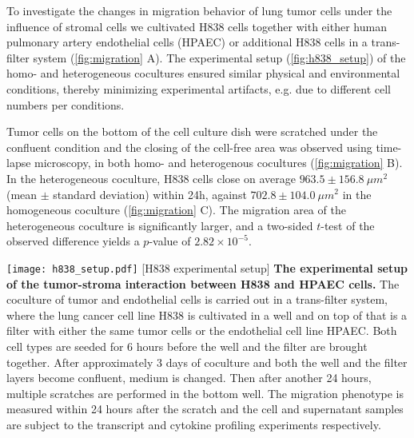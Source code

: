 To investigate the changes in migration behavior of lung tumor cells under the 
influence of stromal cells we cultivated  
H838 cells  together with either human pulmonary artery endothelial cells (HPAEC) or additional H838 cells in a trans-filter system (\ref{fig:migration} A).
The experimental setup (\ref{fig:h838_setup}) of the homo- and heterogeneous cocultures ensured 
similar physical and environmental conditions, thereby minimizing 
experimental artifacts, e.g. due to different cell numbers per conditions. 

Tumor cells on the bottom of the cell culture dish were scratched under the confluent condition and the 
closing of the cell-free area was observed using time-lapse microscopy, in both
homo- and heterogenous cocultures (\ref{fig:migration} B).
In the heterogeneous coculture, 
H838 cells close on average $963.5\pm156.8\ \mu m^2$ 
(mean $\pm$ standard deviation) within 24h, 
against $702.8\pm104.0\ \mu m^2$ in the homogeneous coculture 
(\ref{fig:migration} C). 
The migration area of the heterogeneous coculture is significantly larger, and
a two-sided  $t$-test of the observed difference yields a 
$p$-value of 
$2.82 \times 10^{-5}$.

\begin{center}
\captionsetup{labelformat=prepage}
\texttt{[image: h838\_setup.pdf]}
\newpage
[H838 experimental setup]{
{\bf The experimental setup of the tumor-stroma interaction 
between H838 and HPAEC cells.} 
The coculture of tumor and endothelial cells is carried out
in a trans-filter system, where the lung cancer cell line
H838 is cultivated in a well and on top of that is a filter
with either the same tumor cells or the endothelial cell
line HPAEC. Both cell types are seeded for 6 hours before 
the well and the filter are brought together. After 
approximately 3 days of coculture and both the well and the 
filter layers become confluent, medium is changed. Then
after another 24 hours, multiple scratches are performed
in the bottom well. The migration phenotype is measured within
24 hours after the scratch and the cell and supernatant samples 
are subject to the transcript and cytokine profiling 
experiments respectively.
}
\label{fig:h838_setup}
\end{center}

